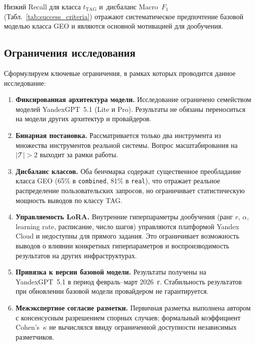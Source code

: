 Низкий Recall для класса $t_{\mathrm{TAG}}$ и~дисбаланс Macro~$F_1$ (Табл.~\ref{tab:success_criteria}) отражают систематическое предпочтение базовой моделью класса GEO и являются основной мотивацией для дообучения.

\subsection{Ограничения исследования}

Сформулируем ключевые ограничения, в рамках которых проводится данное исследование:
\begin{enumerate}
    \item \textbf{Фиксированная архитектура модели.} Исследование ограничено семейством моделей YandexGPT~5.1 (Lite и Pro). Результаты не обязаны переноситься на модели других архитектур и провайдеров.

    \item \textbf{Бинарная постановка.} Рассматривается только два инструмента из множества инструментов реальной системы. Вопрос масштабирования на $|\mathcal{T}| > 2$ выходит за рамки работы.

    \item \textbf{Дисбаланс классов.} Оба бенчмарка содержат существенное преобладание класса GEO (65\% в \texttt{combined}, 81\% в \texttt{real}), что отражает реальное распределение пользовательских запросов, но ограничивает статистическую мощность выводов по классу TAG.

    \item \textbf{Управляемость LoRA.} Внутренние гиперпараметры дообучения (ранг $r$, $\alpha$, learning rate, расписание, число шагов) управляются платформой Yandex Cloud и недоступны для прямого задания. Это ограничивает возможность выводов о влиянии конкретных гиперпараметров и воспроизводимость результатов на других инфраструктурах.

    \item \textbf{Привязка к версии базовой модели.} Результаты получены на YandexGPT~5.1 в период февраль--март 2026~г. Стабильность результатов при обновлении базовой модели провайдером не гарантируется.

    \item \textbf{Межэкспертное согласие разметки.} Первичная разметка выполнена автором с консенсусным разрешением спорных случаев; формальный коэффициент Cohen's~$\kappa$ не вычислялся ввиду ограниченной доступности независимых разметчиков.
\end{enumerate}
